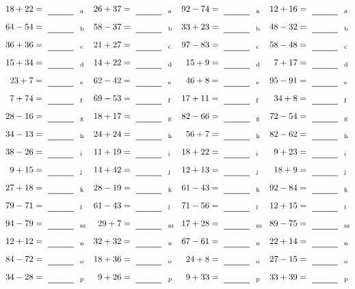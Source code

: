 \documentclass
[
  draft    = true,
  fontsize = 11pt,
  parskip  = half-
]
{scrartcl}
\begin{document}
\clearpage
\begin{align*}
    \pline{18+22}&=\rline{a}
  & \pline{26+37}&=\rline{a}
  & \pline{92-74}&=\rline{a}
  & \pline{12+16}&=\rline{a} \\[1ex]
    \pline{64-54}&=\rline{b}
  & \pline{58-37}&=\rline{b}
  & \pline{33+23}&=\rline{b}
  & \pline{48-32}&=\rline{b} \\[1ex]
    \pline{36+36}&=\rline{c}
  & \pline{21+27}&=\rline{c}
  & \pline{97-83}&=\rline{c}
  & \pline{58-48}&=\rline{c} \\[1ex]
    \pline{15+34}&=\rline{d}
  & \pline{14+22}&=\rline{d}
  & \pline{15+9}&=\rline{d}
  & \pline{7+17}&=\rline{d} \\[1ex]
    \pline{23+7}&=\rline{e}
  & \pline{62-42}&=\rline{e}
  & \pline{46+8}&=\rline{e}
  & \pline{95-91}&=\rline{e} \\[1ex]
    \pline{7+74}&=\rline{f}
  & \pline{69-53}&=\rline{f}
  & \pline{17+11}&=\rline{f}
  & \pline{34+8}&=\rline{f} \\[1ex]
    \pline{28-16}&=\rline{g}
  & \pline{18+17}&=\rline{g}
  & \pline{82-66}&=\rline{g}
  & \pline{72-54}&=\rline{g} \\[1ex]
    \pline{34-13}&=\rline{h}
  & \pline{24+24}&=\rline{h}
  & \pline{56+7}&=\rline{h}
  & \pline{82-62}&=\rline{h} \\[1ex]
    \pline{38-26}&=\rline{i}
  & \pline{11+19}&=\rline{i}
  & \pline{18+22}&=\rline{i}
  & \pline{9+23}&=\rline{i} \\[1ex]
    \pline{9+15}&=\rline{j}
  & \pline{14+42}&=\rline{j}
  & \pline{12+13}&=\rline{j}
  & \pline{18+9}&=\rline{j} \\[1ex]
    \pline{27+18}&=\rline{k}
  & \pline{28-19}&=\rline{k}
  & \pline{61-43}&=\rline{k}
  & \pline{92-84}&=\rline{k} \\[1ex]
    \pline{79-71}&=\rline{l}
  & \pline{61-43}&=\rline{l}
  & \pline{71-56}&=\rline{l}
  & \pline{12+15}&=\rline{l} \\[1ex]
    \pline{94-79}&=\rline{m}
  & \pline{29+7}&=\rline{m}
  & \pline{17+28}&=\rline{m}
  & \pline{89-75}&=\rline{m} \\[1ex]
    \pline{12+12}&=\rline{n}
  & \pline{32+32}&=\rline{n}
  & \pline{67-61}&=\rline{n}
  & \pline{22+14}&=\rline{n} \\[1ex]
    \pline{84-72}&=\rline{o}
  & \pline{18+36}&=\rline{o}
  & \pline{24+8}&=\rline{o}
  & \pline{27-15}&=\rline{o} \\[1ex]
    \pline{34-28}&=\rline{p}
  & \pline{9+26}&=\rline{p}
  & \pline{9+33}&=\rline{p}
  & \pline{33+39}&=\rline{p}
\end{align*}
\end{document}
